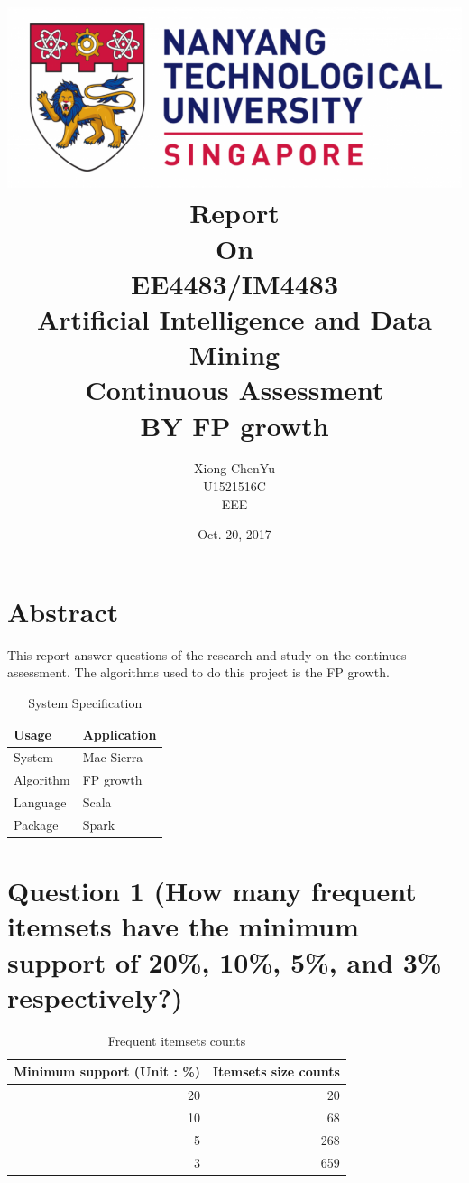 \documentclass[titlepage]{article}
\author{Xiong ChenYu \\
U1521516C \\
EEE \\
}
\date{Oct. 20, 2017 \\
}
\title{\includegraphics[width=\textwidth]{img/NTU.png} \\
[1\baselineskip] Report \\
On \\
EE4483/IM4483 \\
Artificial Intelligence and Data Mining \\
Continuous Assessment \\
BY FP growth \\
[2\baselineskip]}
\begin{document}
\maketitle
\tableofcontents

\listoftables
\listoffigures

\newpage

\section{Abstract}
\label{sec:org2a59890}
This report answer questions of the research and study on the continues assessment.
The algorithms used to do this project is the FP growth.

\begin{table}[htbp]
\caption{\label{tab:org748bca0}
System Specification}
\centering
\begin{tabular}{ll}
Usage & Application\\
\hline
System & Mac Sierra\\
Algorithm & FP growth\\
Language & Scala\\
Package & Spark\\
\end{tabular}
\end{table}

\newpage

\section{Question 1 (How many frequent itemsets have the minimum support of 20\%, 10\%, 5\%, and 3\% respectively?)}
\label{sec:orgf5e4b31}

\begin{table}[htbp]
\caption{\label{tab:org76e6c75}
Frequent itemsets counts}
\centering
\begin{tabular}{rr}
Minimum support (Unit : \%) & Itemsets size counts\\
\hline
20 & 20\\
10 & 68\\
5 & 268\\
3 & 659\\
\end{tabular}
\end{table}
\end{document}
